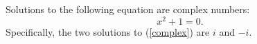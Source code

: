 Solutions to the following equation are complex numbers:
\begin{equation}\label{complex}
x^2+1=0.
\end{equation}
Specifically, the two solutions to (\ref{complex}) are $i$ and $-i$.

